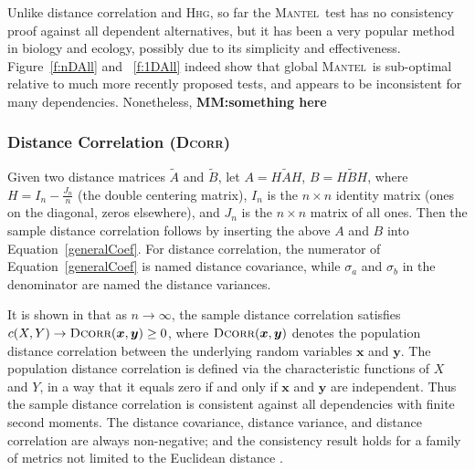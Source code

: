\documentclass[11pt]{article}
\providecommand{\sct}[1]{{\normalfont\textsc{#1}}}
\providecommand{\mb}[1]{\boldsymbol{#1}}
\newcommand{\GG}{c}
\newcommand{\Mgc}{\sct{Mgc}}
\newcommand{\Mgcp}{\sct{Mgc$_P$}}
\newcommand{\Hhg}{\sct{Hhg}}
\newcommand{\Dcorr}{\sct{Dcorr}}
\newcommand{\Mantel}{\sct{Mantel}}
\begin{document}
Unlike distance correlation and \Hhg, so far the \Mantel~test has no consistency proof against all dependent alternatives, 
but it has been a very popular method in biology and ecology, possibly due to its simplicity and effectiveness. Figure~\ref{f:nDAll} and ~\ref{f:1DAll} indeed show that global \Mantel~is sub-optimal relative to much more recently proposed tests, and appears to be inconsistent for many dependencies. Nonetheless, %
{\bf{MM:something here}}

\subsubsection{Distance Correlation (\Dcorr)}
\label{appen:dcorr}
Given two distance matrices $\tilde{A}$ and $\tilde{B}$, let $A=H\tilde{A}H$, $B=H\tilde{B}H$, where $H=I_{n}-\frac{J_{n}}{n}$ (the double centering matrix), $I_n$ is the $n \times n$ identity matrix (ones on the diagonal, zeros elsewhere), and $J_n$ is the $n \times n$ matrix of all ones. Then the sample distance correlation follows by inserting the above $A$ and $B$ into Equation~\ref{generalCoef}. For distance correlation, the numerator of Equation~\ref{generalCoef} is named distance covariance, while $\sigma_a$ and $\sigma_b$ in the denominator are named the distance variances. %

It is shown in \cite{SzekelyRizzoBakirov2007} that as $n \rightarrow \infty$, the sample distance correlation satisfies $\GG(X,Y) \rightarrow \Dcorr(\mb{x},\mb{y}) \geq 0$, where $\Dcorr(\mb{x},\mb{y})$ denotes the population distance correlation between the underlying random variables $\mb{x}$ and $\mb{y}$. 
The population distance correlation is defined via the characteristic functions of $X$ and $Y$, in a way that it equals zero if and only if $\mb{x}$ and $\mb{y}$ are independent. Thus the sample distance correlation is consistent against all dependencies with finite second moments. The distance covariance, distance variance, and distance correlation are always non-negative; and the consistency result holds for a family of metrics not limited to the Euclidean distance \cite{Lyons2013}. %
\end{document}

